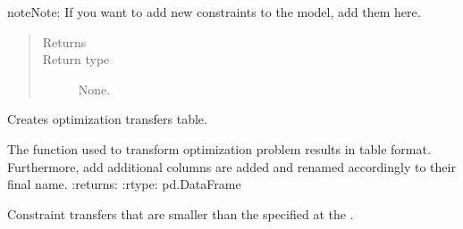 \documentclass[letterpaper,10pt,english]{sphinxmanual}
\begin{document}
\begin{fulllineitems}
\begin{fulllineitems}
\begin{sphinxadmonition}{note}{Note:}
If you want to add new constraints to the model, add them here.
\end{sphinxadmonition}
\begin{quote}\begin{description}
\item[{Returns}] \leavevmode


\item[{Return type}] \leavevmode
None.

\end{description}\end{quote}

\end{fulllineitems}


\begin{fulllineitems}
\label{\detokenize{source/optimization.model:optimization.model.optimizer.OptimizationModel._create_opt_df}}
Creates optimization transfers table.

The function used to transform optimization problem results in table format.         Furthermore, add additional columns are added and         renamed accordingly to their final name.
:returns: 
:rtype: pd.DataFrame

\end{fulllineitems}


\begin{fulllineitems}
\label{\detokenize{source/optimization.model:optimization.model.optimizer.OptimizationModel._min_shipment_value_constraint}}
Constraint transfers that are smaller than the  specified at the .


\end{fulllineitems}
\end{fulllineitems}
\end{document}
